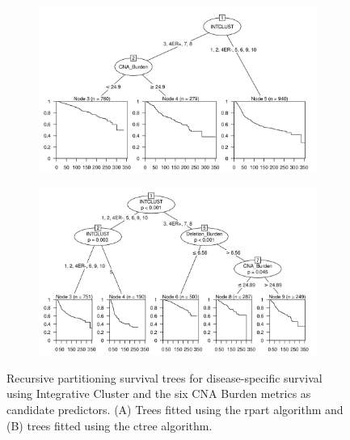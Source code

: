 \begin{figure}[!h]
\centering

\vspace{0.5cm}

\begin{subfigure}{\textwidth}
\subcaption{}
\includegraphics[width=1\textwidth]{../figures/Chapter_3/PartyKit_Survival_Burden_DSS_INTCLUST.png}
\end{subfigure}

\vspace{2cm}

\begin{subfigure}{\textwidth}
\subcaption{}
\includegraphics[width=1\textwidth]{../figures/Chapter_3/Ctree_Survival_Burden_DSS_INTCLUST.png}
\end{subfigure}

\vspace{0.5cm}

\caption[Recursive partitioning survival trees for disease-specific survival using Integrative Cluster and the six CNA Burden metrics as candidate predictors.]{Recursive partitioning survival trees for disease-specific survival using Integrative Cluster and the six CNA Burden metrics as candidate predictors. (A) Trees fitted using the rpart algorithm and (B) trees fitted using the ctree algorithm.}
\label{fig:INTCLUST_CNA_Burden_DSS}
\end{figure}

